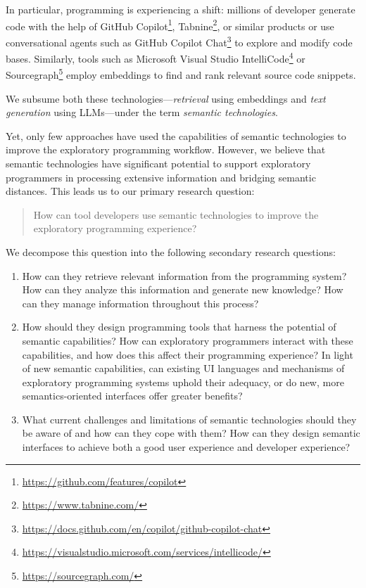 In particular, programming is experiencing a shift: millions of developer generate code with the help of GitHub Copilot\footnote{\url{https://github.com/features/copilot}}, Tabnine\footnote{\url{https://www.tabnine.com/}}, or similar products or use conversational agents such as GitHub Copilot Chat\footnote{\url{https://docs.github.com/en/copilot/github-copilot-chat}} to explore and modify code bases.
Similarly, tools such as Microsoft Visual Studio IntelliCode\footnote{\url{https://visualstudio.microsoft.com/services/intellicode/}} or Sourcegraph\footnote{\url{https://sourcegraph.com/}} employ embeddings to find and rank relevant source code snippets.

We subsume both these technologies---\emph{retrieval} using embeddings and \emph{text generation} using LLMs---under the term \emph{semantic technologies}.

\ParSep

Yet, only few approaches have used the capabilities of semantic technologies to improve the exploratory programming workflow.
However, we believe that semantic technologies have significant potential to support exploratory programmers in processing extensive information and bridging semantic distances.
This leads us to our primary research question:

\begin{quote}
	How can tool developers use semantic technologies to improve the exploratory programming experience?
\end{quote}

We decompose this question into the following secondary research questions:

\begin{enumerate}[label=RQ\arabic*]
	\item {}
		How can they retrieve relevant information from the programming system? How can they analyze this information and generate new knowledge?
		How can they manage information throughout this process?
	\item {}
		How should they design programming tools that harness the potential of semantic capabilities?
		How can exploratory programmers interact with these capabilities, and how does this affect their programming experience?
		In light of new semantic capabilities, can existing UI languages and mechanisms of exploratory programming systems uphold their adequacy, or do new, more semantics-oriented interfaces offer greater benefits?
	\item {}
		What current challenges and limitations of semantic technologies should they be aware of and how can they cope with them?
		How can they design semantic interfaces to achieve both a good user experience and developer experience?
\end{enumerate}

